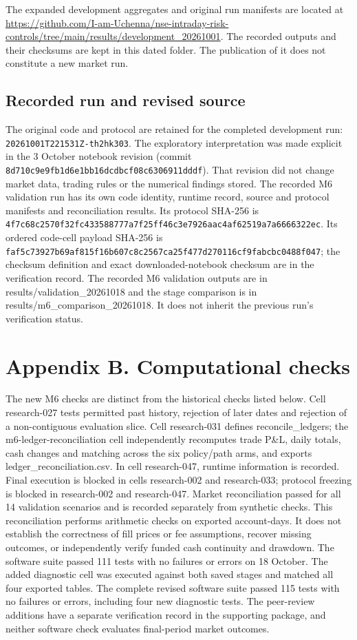 \documentclass[11pt,a4paper]{article}
\begin{document}
The expanded development aggregates and original run manifests are located at \url{https://github.com/I-am-Uchenna/nse-intraday-risk-controls/tree/main/results/development_20261001}. The recorded outputs and their checksums are kept in this dated folder. The publication of it does not constitute a new market run.

\subsection*{Recorded run and revised source}

The original code and protocol are retained for the completed development run: \nolinkurl{20261001T221531Z-th2hk303}. The exploratory interpretation was made explicit in the 3 October notebook revision (commit \nolinkurl{8d710c9e9fb1d6e1bb16dcdbcf08c6306911dddf}). That revision did not change market data, trading rules or the numerical findings stored. The recorded M6 validation run has its own code identity, runtime record, source and protocol manifests and reconciliation results. Its protocol SHA-256 is \nolinkurl{4f7c68c2570f32fc433588777a7f25ff46c3e7926aac4af62519a7a6666322ec}. Its ordered code-cell payload SHA-256 is \nolinkurl{faf5c73927b69af815f16b607c8c2567ca25f477d270116cf9fabcbc0488f047}; the checksum definition and exact downloaded-notebook checksum are in the verification record. The recorded M6 validation outputs are in results/validation\_20261018 and the stage comparison is in results/m6\_comparison\_20261018. It does not inherit the previous run's verification status.

\section*{Appendix B. Computational checks}


The new M6 checks are distinct from the historical checks listed below. Cell research-027 tests permitted past history, rejection of later dates and rejection of a non-contiguous evaluation slice. Cell research-031 defines reconcile\_ledgers; the m6-ledger-reconciliation cell independently recomputes trade P\&L, daily totals, cash changes and matching across the six policy/path arms, and exports ledger\_reconciliation.csv. In cell research-047, runtime information is recorded. Final execution is blocked in cells research-002 and research-033; protocol freezing is blocked in research-002 and research-047. Market reconciliation passed for all 14 validation scenarios and is recorded separately from synthetic checks. This reconciliation performs arithmetic checks on exported account-days. It does not establish the correctness of fill prices or fee assumptions, recover missing outcomes, or independently verify funded cash continuity and drawdown. The software suite passed 111 tests with no failures or errors on 18 October. The added diagnostic cell was executed against both saved stages and matched all four exported tables. The complete revised software suite passed 115 tests with no failures or errors, including four new diagnostic tests. The peer-review additions have a separate verification record in the supporting package, and neither software check evaluates final-period market outcomes.
\end{document}
